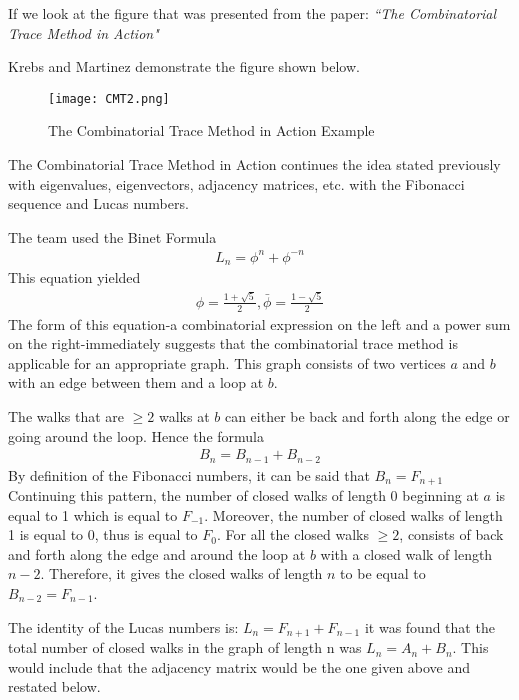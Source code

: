 \par If we look at the figure that was presented from the paper: \textit{``The Combinatorial Trace Method in Action"}

Krebs and Martinez demonstrate the figure shown below. 

\begin{figure}[h]
         \centering
         \texttt{[image: CMT2.png]}
         \caption{\small{The Combinatorial Trace Method in Action Example}}
 \end{figure}

The Combinatorial Trace Method in Action continues the idea stated previously with eigenvalues, eigenvectors, adjacency matrices, etc. with the Fibonacci sequence and Lucas numbers.

\par The team used the Binet Formula 
\begin{align*}
    L_n = \phi^n + \phi^{-n}
\end{align*}
This equation yielded \\
\begin{align*} 
    \phi = \frac{1+\sqrt{5}}{2}, \bar\phi= \frac{1-\sqrt{5}}{2}
\end{align*}
The form of this equation-a combinatorial expression on the left and a power sum on the right-immediately suggests that the combinatorial trace method is applicable for an appropriate graph. This graph consists of two vertices $a$ and $b$ with an edge between them and a loop at $b$. 


 The walks that are $\geq 2$ walks at $b$ can either be back and forth along the edge or going around the loop. Hence the formula 
 \begin{align*}
     B_n = B_{n-1} + B_{n-2}     
 \end{align*}
 By definition of the Fibonacci numbers, it can be said that $B_n = F_{n+1}$
 Continuing this pattern, the number of closed walks of length 0 beginning at $a$ is equal to 1 which is equal to $F_{-1}$.  Moreover, the number of closed walks of length 1 is equal to 0, thus is equal to $F_0$.  For all the closed walks $\geq 2$, consists of back and forth along the edge and around the loop at $b$ with a closed walk of length $n-2$.  Therefore, it gives the closed walks of length $n$ to be equal to $B_{n-2} = F_{n-1}$. 
 \par The identity of the Lucas numbers is: $L_n = F_{n+1} + F_{n-1}$ it was found that the total number of closed walks in the graph of length n was $L_n = A_{n} + B_{n}$. This would include that the adjacency matrix would be the one given above and restated below. 

